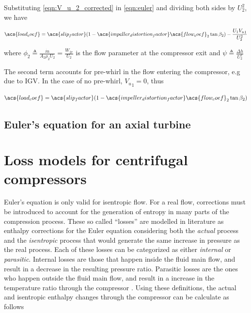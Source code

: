 \documentclass[tcc]{subfiles}
\begin{document}
Substituting \cref{eqn:V_u_2_corrected} in \cref{eqn:euler} and dividing both sides by ${U_2^2}$, we have

\begin{equation}
    \acs{load_coef} = \acs{slip_factor}(1-\acs{impeller_distortion_factor}\acs{flow_coef}_2\tan\beta_2) - \frac{U_1 {V_u}_1}{U_2^2} 
\end{equation}

where $\phi_2 \triangleq \frac{\dot{m}}{A_2 \rho_2 U_2} = \frac{W_{2r}}{U_2}$ is the flow parameter at the compressor exit
and $\psi \triangleq \frac{\Delta h}{U_2^2}$

The second term accounts for pre-whirl in the flow entering the compressor, e.g due to \ac{IGV}.
In the case of no pre-whirl, ${V_u}_1 = 0$, thus 

\begin{equation}
    \label{eqn:euler}
    \acs{load_coef} = \acs{slip_factor}(1-\acs{impeller_distortion_factor}\acs{flow_coef}_2\tan\beta_2)  
\end{equation}

\subsection{Euler's equation for an axial turbine}

\section{Loss models for centrifugal compressors}
\label{sec:compressor_losses}
Euler's equation is only valid for isentropic flow. 
For a real flow, corrections must be introduced to account for the generation of entropy in many parts of the compression process. 
These so called ``losses'' are modelled in literature as enthalpy corrections 
for the Euler equation considering both the \emph{actual} process and the \emph{isentropic} process 
that would generate the same increase in pressure as the real process.
Each of these losses can be categorized as either \emph{internal} or \emph{parasitic}.
Internal losses are those that happen inside the fluid main flow, and result in a decrease in the resulting pressure ratio.
Parasitic losses are the ones who happen outside the fluid main flow, 
and result in a increase in the temperature ratio through the compressor \cite{Galvas1973}.
Using these definitions, the actual and isentropic enthalpy changes through the compressor can be calculate as follows
\end{document}

